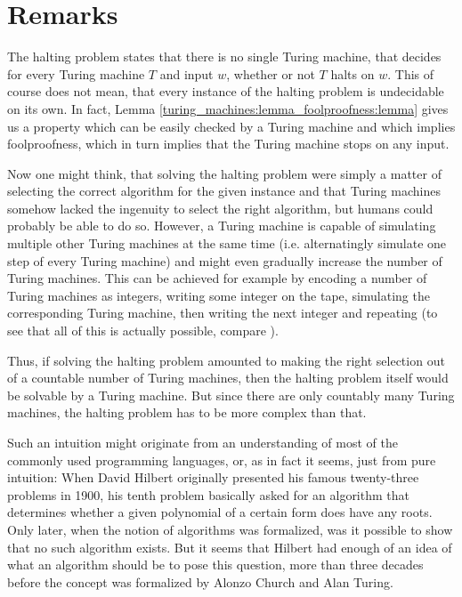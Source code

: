 \section{Remarks}

\begin{Remark}
	\label{remarks:scope_of_halting_problem}
	The halting problem states that there is no single Turing machine, that decides for every Turing machine $T$ and input $w$, whether or not $T$ halts on $w$.
	This of course does not mean, that every instance of the halting problem is undecidable on its own.
	In fact, Lemma \ref{turing_machines:lemma_foolproofness:lemma} gives us a property which can be easily checked by a Turing machine and which implies foolproofness, which in turn implies that the Turing machine stops on any input.

	Now one might think, that solving the halting problem were simply a matter of selecting the correct algorithm for the given instance and that Turing machines somehow lacked the ingenuity to select the right algorithm, but humans could probably be able to do so.
	However, a Turing machine is capable of simulating multiple other Turing machines at the same time (i.e. alternatingly simulate one step of every Turing machine) and might even gradually increase the number of Turing machines.
	This can be achieved for example by encoding a number of Turing machines as integers, writing some integer on the tape, simulating the corresponding Turing machine, then writing the next integer and repeating (to see that all of this is actually possible, compare \cite{sip06}).

	Thus, if solving the halting problem amounted to making the right selection out of a countable number of Turing machines, then the halting problem itself would be solvable by a Turing machine.
	But since there are only countably many Turing machines, the halting problem has to be more complex than that.
\end{Remark}

\begin{Remark}
	\label{remarks:intuitive_algorithms}
	Such an intuition might originate from an understanding of most of the commonly used programming languages, or, as in fact it seems, just from pure intuition: When David Hilbert originally presented his famous twenty-three problems in 1900, his tenth problem basically asked for an algorithm that determines whether a given polynomial of a certain form does have any roots.
	Only later, when the notion of algorithms was formalized, was it possible to show that no such algorithm exists.
	But it seems that Hilbert had enough of an idea of what an algorithm should be to pose this question, more than three decades before the concept was formalized by Alonzo Church and Alan Turing.
\end{Remark}

